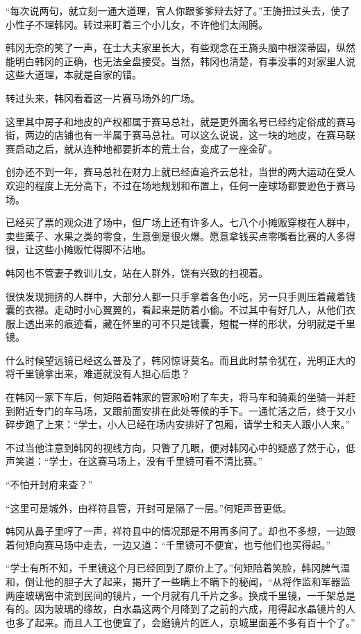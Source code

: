 “每次说两句，就立刻一通大道理，官人你跟爹爹辩去好了。”王旖扭过头去，使了小性子不理韩冈。转过来盯着三个小儿女，不许他们太闹腾。

韩冈无奈的笑了一声，在士大夫家里长大，有些观念在王旖头脑中根深蒂固，纵然能明白韩冈的正确，也无法全盘接受。当然，韩冈也清楚，有事没事的对家里人说这些大道理，本就是自家的错。

转过头来，韩冈看着这一片赛马场外的广场。

这里其中房子和地皮的产权都属于赛马总社，就是更外面名号已经约定俗成的赛马街，两边的店铺也有一半属于赛马总社。可以这么说说，这一块的地皮，在赛马联赛启动之后，就从连种地都要折本的荒土台，变成了一座金矿。

创办还不到一年，赛马总社在财力上就已经直追齐云总社，当世的两大运动在受人欢迎的程度上无分高下，不过在场地规划和布置上，任何一座球场都要逊色于赛马场。

已经买了票的观众进了场中，但广场上还有许多人。七八个小摊贩穿梭在人群中，卖些菓子、水果之类的零食，生意倒是很火爆。愿意拿钱买点零嘴看比赛的人多得很，让这些小摊贩忙得脚不沾地。

韩冈也不管妻子教训儿女，站在人群外，饶有兴致的扫视着。

很快发现拥挤的人群中，大部分人都一只手拿着各色小吃，另一只手则压着藏着钱囊的衣襟。走动时小心翼翼的，看起来是防着小偷。不过其中有好几人，从他们衣服上透出来的痕迹看，藏在怀里的可不只是钱囊，短棍一样的形状，分明就是千里镜。

什么时候望远镜已经这么普及了，韩冈惊讶莫名。而且此时禁令犹在，光明正大的将千里镜拿出来，难道就没有人担心后患？

在韩冈一家下车后，何矩陪着韩家的管家吩咐了车夫，将马车和骑乘的坐骑一并赶到附近专门的车马场，又跟前面安排在此处等候的手下。一通忙活之后，终于又小碎步跑了上来：“学士，小人已经在场内安排好了包厢，请学士和夫人跟小人来。”

不过当他注意到韩冈的视线方向，只瞥了几眼，便对韩冈心中的疑惑了然于心，低声笑道：“学士，在这赛马场上，没有千里镜可看不清比赛。”

“不怕开封府来查？”

“这里可是城外，由祥符县管，开封可是隔了一层。”何矩声音更低。

韩冈从鼻子里哼了一声，祥符县中的情况那是不用再多问了。却也不多想，一边跟着何矩向赛马场中走去，一边又道：“千里镜可不便宜，也亏他们也买得起。”

“学士有所不知，千里镜这个月已经回到了原价上了。”何矩陪着笑脸，韩冈脾气温和，倒让他的胆子大了起来，揭开了一些瞒上不瞒下的秘闻，“从将作监和军器监两座玻璃窑中流到民间的镜片，一个月就有几千片之多。换成千里镜，一千架总是有的。因为玻璃的缘故，白水晶这两个月降到了之前的六成，用得起水晶镜片的人也多了起来。而且人工也便宜了，会磨镜片的匠人，京城里面差不多有百十个了。”

